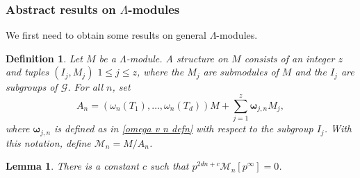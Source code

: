 \documentclass{amsart}
\newtheorem{lemma}[theorem]{Lemma}
\newtheorem{definition}[theorem]{Definition}
\numberwithin{equation}{section}
\theoremstyle{remark}
\newcommand{\bomega}{\boldsymbol{\omega}}
\theoremstyle{plain} %
\begin{document}
\subsubsection{Abstract results on \texorpdfstring{$\Lambda$}{}-modules}

We first need to obtain some results on general $\Lambda$-modules.

\begin{definition}
\label{structure}
Let $M$ be a $\Lambda$-module.
A \emph{structure} on $M$ consists of an integer $z$ and tuples $(I_j,M_j)$ $1\le j\le z$, where the $M_j$ are submodules of $M$ and the $I_j$ are subgroups of $\mathcal{G}$. 
For all $n$, set
\[
A_n=(\omega_n(T_1),\dots, \omega_n(T_d))M+\sum_{j=1}^{z}\bomega_{j,n}M_j,
\]
where $\bomega_{j,n}$ is defined {as in \eqref{omega v n defn}} with respect to the subgroup $I_j$. 
With this notation, define $\mathcal{M}_n=M/A_n$.
\end{definition}
\begin{lemma}
\label{ex-const}
There is a constant $c$ such that $p^{2dn+c}\mathcal{M}_n[p^\infty]=0$.
\end{lemma}
\end{document}
